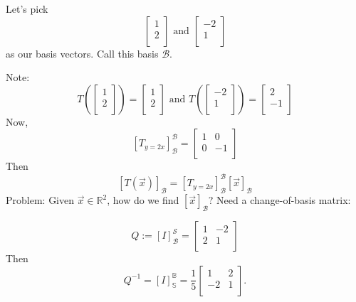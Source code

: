 \documentclass[a4paper,10pt]{article}
\theoremstyle{definition}
\begin{document}
\begin{enumerate}
Let's pick 
$$\begin{bmatrix} 
1 \\
2 \\
\end{bmatrix} 
\text{ and }
\begin{bmatrix} 
-2 \\
1 \\
\end{bmatrix} 
$$
as our basis vectors. Call this basis $\mathcal{B}$.

Note:
$$
T\left(
\begin{bmatrix} 
1 \\
2 \\
\end{bmatrix} 
\right)
=
\begin{bmatrix} 
1 \\
2 \\
\end{bmatrix} 
\text{ and }
T\left(
\begin{bmatrix} 
-2 \\
1 \\
\end{bmatrix} 
\right)
=
\begin{bmatrix} 
2 \\
-1 \\
\end{bmatrix} 
$$
Now, 
$$
[T_{y=2x}]_\mathcal{B}^\mathcal{B} = 
\begin{bmatrix}
	1 & 0 \\
	0 & -1 \\
\end{bmatrix}
$$
Then
$$
[T(\vec{x})]_\mathcal{B} = [T_{y=2x}]_\mathcal{B}^\mathcal{B}[\vec{x}]_\mathcal{B}
$$
Problem: Given $\vec{x} \in \mathbb{R}^2$, how do we find $[\vec{x}]_\mathcal{B}$? Need a change-of-basis matrix:

$$
Q:= [I]_\mathcal{B}^\mathcal{S} =
\begin{bmatrix}
	1 & -2 \\
	2 & 1 \\
\end{bmatrix}
$$
Then
$$
Q^{-1} = [I]_\mathbb{S}^\mathbb{B} =
\frac{1}{5}
\begin{bmatrix}
	1 & 2 \\
	-2 & 1 \\
\end{bmatrix}
.
$$


\end{enumerate}
\end{document}
